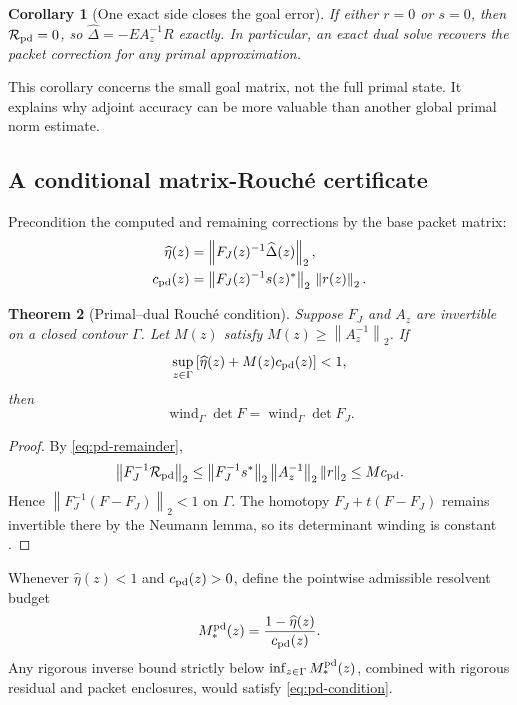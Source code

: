\documentclass[11pt]{article}
\newtheorem{theorem}{Theorem}[section]
\newtheorem{corollary}[theorem]{Corollary}
\theoremstyle{definition}
\theoremstyle{remark}
\newcommand{\wind}{\operatorname{wind}}
\newcommand{\norm}[1]{\left\lVert#1\right\rVert}
\begin{document}
\begin{corollary}[One exact side closes the goal error]
\label{cor:exact-side}
If either \(r=0\) or \(s=0\), then
\(\mathcal R_{\rm pd}=0\), so \(\widehat\Delta=-EA_z^{-1}R\) exactly.
In particular, an exact dual solve recovers the packet correction for any
primal approximation.
\end{corollary}

This corollary concerns the small goal matrix, not the full primal state.
It explains why adjoint accuracy can be more valuable than another global
primal norm estimate.

\subsection{A conditional matrix-Rouch\'e certificate}

Precondition the computed and remaining corrections by the base packet
matrix:
\begin{align}
 \widehat\eta(z)&=\norm{F_J(z)^{-1}\widehat\Delta(z)}_2,
 \label{eq:eta-hat}\\
 c_{\rm pd}(z)&=
 \norm{F_J(z)^{-1}s(z)^*}_2\,\norm{r(z)}_2.
 \label{eq:pd-coefficient}
\end{align}

\begin{theorem}[Primal--dual Rouch\'e condition]
\label{thm:pd-rouche}
Suppose \(F_J\) and \(A_z\) are invertible on a closed contour \(\Gamma\).
Let \(M(z)\) satisfy
\(M(z)\geq\norm{A_z^{-1}}_2\).  If
\begin{equation}
 \sup_{z\in\Gamma}
 \left[\widehat\eta(z)+M(z)c_{\rm pd}(z)\right]<1,
 \label{eq:pd-condition}
\end{equation}
then
\begin{equation}
 \wind_\Gamma\det F=\wind_\Gamma\det F_J.
 \label{eq:pd-winding-transfer}
\end{equation}
\end{theorem}

\begin{proof}
By \cref{eq:pd-remainder},
\[
 \norm{F_J^{-1}\mathcal R_{\rm pd}}_2
 \leq
 \norm{F_J^{-1}s^*}_2\norm{A_z^{-1}}_2\norm r_2
 \leq M c_{\rm pd}.
\]
Hence \(\norm{F_J^{-1}(F-F_J)}_2<1\) on \(\Gamma\).  The homotopy
\(F_J+t(F-F_J)\) remains invertible there by the Neumann lemma, so its
determinant winding is constant \citep{GohbergSigal1971}.
\end{proof}

Whenever \(\widehat\eta(z)<1\) and \(c_{\rm pd}(z)>0\), define the
pointwise admissible resolvent budget
\begin{equation}
 M_*^{\rm pd}(z)=
 \frac{1-\widehat\eta(z)}{c_{\rm pd}(z)}.
 \label{eq:pd-budget}
\end{equation}
Any rigorous inverse bound strictly below
\(\inf_{z\in\Gamma}M_*^{\rm pd}(z)\), combined with rigorous residual and
packet enclosures, would satisfy \cref{eq:pd-condition}.
\end{document}
